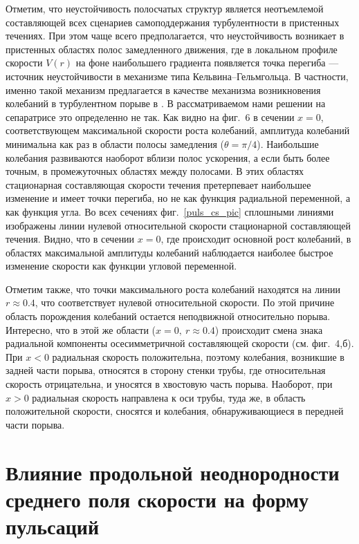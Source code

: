 Отметим, что неустойчивость полосчатых структур является неотъемлемой составляющей всех сценариев самоподдержания турбулентности в пристенных течениях. При этом чаще всего предполагается, что неустойчивость возникает в пристенных областях полос замедленного движения, где в локальном профиле скорости $V(r)$ на фоне наибольшего градиента появляется точка перегиба --- источник неустойчивости в механизме типа Кельвина--Гельмгольца. В частности, именно такой механизм предлагается в качестве механизма возникновения колебаний в турбулентном порыве в \cite{Shimizu2009}. В рассматриваемом нами решении на сепаратрисе это определенно не так. Как видно на фиг.~6 в сечении $x=0$, соответствующем максимальной скорости роста колебаний, амплитуда колебаний минимальна как раз в области полосы замедления ($\theta=\pi/4$). Наибольшие колебания развиваются наоборот вблизи полос ускорения, а если быть более точным, в промежуточных областях между полосами. В этих областях стационарная составляющая скорости течения претерпевает наибольшее изменение и имеет точки перегиба, но не как функция радиальной переменной, а как функция угла. Во всех сечениях фиг.~\ref{puls_cs_pic} сплошными линиями изображены линии нулевой относительной скорости стационарной составляющей течения. Видно, что в сечении $x=0$, где происходит основной рост колебаний, в областях максимальной амплитуды колебаний наблюдается наиболее быстрое изменение скорости как функции угловой переменной.

Отметим также, что точки максимального роста колебаний находятся на линии $r\approx0.4$, что соответствует нулевой относительной скорости. По этой причине область порождения колебаний остается неподвижной относительно порыва. Интересно, что в этой же области ($x=0,\ r\approx0.4$) происходит смена знака радиальной компоненты осесимметричной составляющей скорости (см. фиг.~4,б). При $x<0$ радиальная скорость положительна, поэтому колебания, возникшие в задней части порыва, относятся в сторону стенки трубы, где относительная скорость отрицательна, и уносятся в хвостовую часть порыва. Наоборот, при $x>0$ радиальная скорость направлена к оси трубы, туда же, в область положительной скорости, сносятся и колебания, обнаруживающиеся в передней части порыва.


\section{Влияние продольной неоднородности среднего поля скорости на форму пульсаций}

